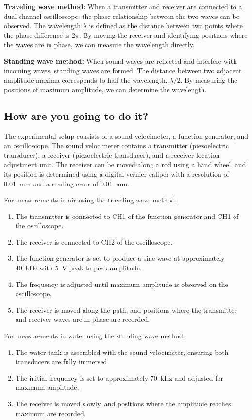 \documentclass[12pt]{article}
\begin{document}
\textbf{Traveling wave method:} When a transmitter and receiver are connected to a dual-channel oscilloscope, the phase relationship between the two waves can be observed. The wavelength $\lambda$ is defined as the distance between two points where the phase difference is $2\pi$. By moving the receiver and identifying positions where the waves are in phase, we can measure the wavelength directly.

\textbf{Standing wave method:} When sound waves are reflected and interfere with incoming waves, standing waves are formed. The distance between two adjacent amplitude maxima corresponds to half the wavelength, $\lambda/2$. By measuring the positions of maximum amplitude, we can determine the wavelength.

\subsection{How are you going to do it?}

The experimental setup consists of a sound velocimeter, a function generator, and an oscilloscope. The sound velocimeter contains a transmitter (piezoelectric transducer), a receiver (piezoelectric transducer), and a receiver location adjustment unit. The receiver can be moved along a rod using a hand wheel, and its position is determined using a digital vernier caliper with a resolution of \SI{0.01}{\milli\meter} and a reading error of \SI{0.01}{\milli\meter}.

For measurements in air using the traveling wave method:
\begin{enumerate}[leftmargin=*]
\item The transmitter is connected to CH1 of the function generator and CH1 of the oscilloscope.
\item The receiver is connected to CH2 of the oscilloscope.
\item The function generator is set to produce a sine wave at approximately \SI{40}{\kilo\hertz} with \SI{5}{\volt} peak-to-peak amplitude.
\item The frequency is adjusted until maximum amplitude is observed on the oscilloscope.
\item The receiver is moved along the path, and positions where the transmitter and receiver waves are in phase are recorded.
\end{enumerate}

For measurements in water using the standing wave method:
\begin{enumerate}[leftmargin=*]
\item The water tank is assembled with the sound velocimeter, ensuring both transducers are fully immersed.
\item The initial frequency is set to approximately \SI{70}{\kilo\hertz} and adjusted for maximum amplitude.
\item The receiver is moved slowly, and positions where the amplitude reaches maximum are recorded.
\end{enumerate}
\end{document}
